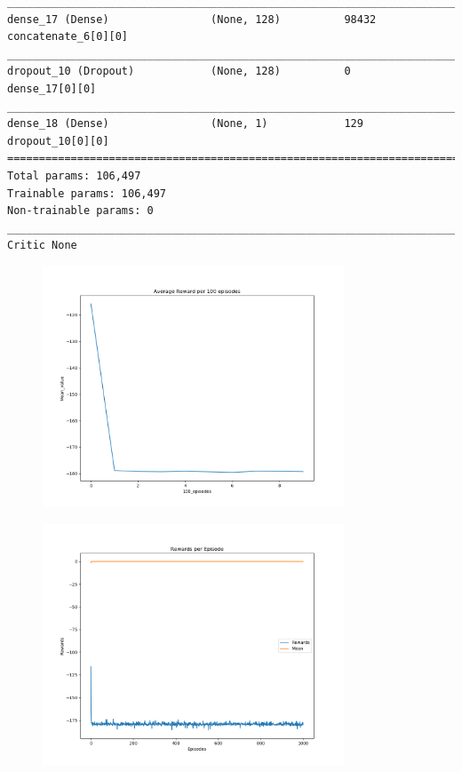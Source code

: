 \documentclass[man, 12pt]{apa6}
\begin{document}
\begin{verbatim}
__________________________________________________________________________________________________
dense_17 (Dense)                (None, 128)          98432       concatenate_6[0][0]              
__________________________________________________________________________________________________
dropout_10 (Dropout)            (None, 128)          0           dense_17[0][0]                   
__________________________________________________________________________________________________
dense_18 (Dense)                (None, 1)            129         dropout_10[0][0]                 
==================================================================================================
Total params: 106,497
Trainable params: 106,497
Non-trainable params: 0
__________________________________________________________________________________________________
Critic None
\end{verbatim} 

\FloatBarrier
\begin{figure}[H!]
\includegraphics[width=0.8\textwidth]{results/ddpg/run4/mean_100.png}
\end{figure}
\FloatBarrier
\begin{figure}[H!]
\includegraphics[width=0.8\textwidth]{results/ddpg/run4/Rewards.png}
\end{figure}
\FloatBarrier
\end{document}
